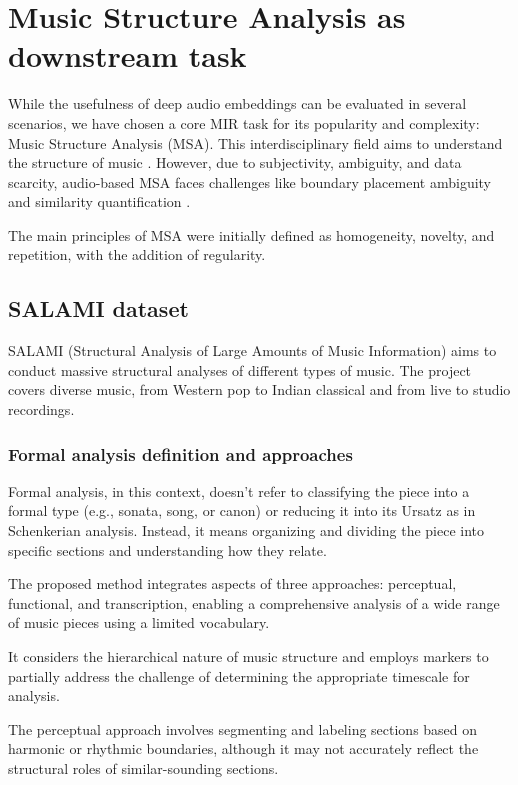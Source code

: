 \section{Music Structure Analysis as downstream task}

While the usefulness of deep audio embeddings can be evaluated in several scenarios, we have chosen a core MIR task for its popularity and complexity: Music Structure Analysis (MSA). This interdisciplinary field aims to understand the structure of music \cite{Nieto2020Audio-BasedApplications}. However, due to subjectivity, ambiguity, and data scarcity, audio-based MSA faces challenges like boundary placement ambiguity and similarity quantification \cite{NietoPerceptualMusic}. 

The main principles of MSA were initially defined as homogeneity, novelty, and repetition, with the addition of regularity. 

\subsection{SALAMI dataset}

SALAMI (Structural Analysis of Large Amounts of Music Information) \cite{Smith2011DESIGNANNOTATIONS} aims to conduct massive structural analyses of different types of music. The project covers diverse music, from Western pop to Indian classical and from live to studio recordings.

\subsubsection{Formal analysis definition and approaches}
Formal analysis, in this context, doesn't refer to classifying the piece into a formal type (e.g., sonata, song, or canon) or reducing it into its Ursatz as in Schenkerian analysis. Instead, it means organizing and dividing the piece into specific sections and understanding how they relate.

The proposed method integrates aspects of three approaches: perceptual, functional, and transcription, enabling a comprehensive analysis of a wide range of music pieces using a limited vocabulary. 

It considers the hierarchical nature of music structure and employs markers to partially address the challenge of determining the appropriate timescale for analysis. 

The perceptual approach involves segmenting and labeling sections based on harmonic or rhythmic boundaries, although it may not accurately reflect the structural roles of similar-sounding sections. 

